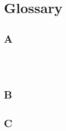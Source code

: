 \setcounter{secnumdepth}{-2}

\chapter{Glossary}

\section*{A}

\noindent\acceptanceCriterionDef\\

\noindent\agileDef\\

\noindent\attitudeTowardRiskCsfDef

\section*{B}

\noindent\businessCapabilityDef

\section*{C}

\noindent\classDiagramDef\\

\noindent\clientDef\\

\noindent\clientServerArchitectureDef\\

\noindent\codeDecayDef\\

\noindent\codeSmellDef\\

\noindent\cognitiveStyleFacetsDef\\

\noindent\cognitiveStyleFacetValueDef\\

\noindent\cognitiveStyleHeuristicsDef\\

\noindent\cognitiveStylePersonasDef\\

\noindent\cognitiveWalkthroughDef\\

\noindent\componentDef\\

\noindent\computerSelfEfficacyCsfDef\\

